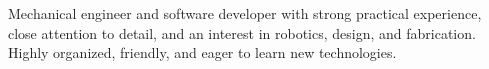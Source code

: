 \begin{minipage}[t]{0.5\sectionHeaderIndent}
    \hspace{0em}
\end{minipage}%
\begin{minipage}[t]{\textwidth - \sectionHeaderIndent}
    Mechanical engineer and software developer with strong practical experience, close attention to detail, and an interest in robotics, design, and fabrication. Highly organized, friendly, and eager to learn new technologies.
\end{minipage}
\break
